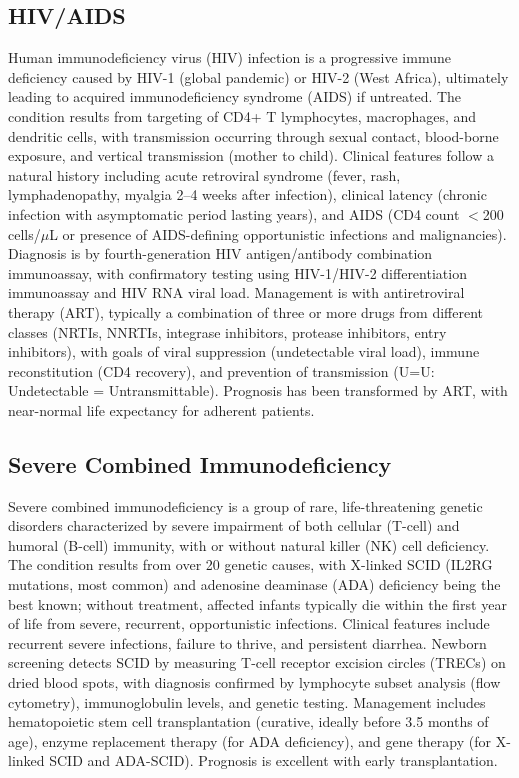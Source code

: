 \subsection{HIV/AIDS}
\label{sec:HIV/AIDS}
Human immunodeficiency virus (HIV) infection is a progressive immune deficiency caused by HIV-1 (global pandemic) or HIV-2 (West Africa), ultimately leading to acquired immunodeficiency syndrome (AIDS) if untreated. The condition results from targeting of CD4+ T lymphocytes, macrophages, and dendritic cells, with transmission occurring through sexual contact, blood-borne exposure, and vertical transmission (mother to child). Clinical features follow a natural history including acute retroviral syndrome (fever, rash, lymphadenopathy, myalgia 2--4 weeks after infection), clinical latency (chronic infection with asymptomatic period lasting years), and AIDS (CD4 count $<$200 cells/$\mu$L or presence of AIDS-defining opportunistic infections and malignancies). Diagnosis is by fourth-generation HIV antigen/antibody combination immunoassay, with confirmatory testing using HIV-1/HIV-2 differentiation immunoassay and HIV RNA viral load. Management is with antiretroviral therapy (ART), typically a combination of three or more drugs from different classes (NRTIs, NNRTIs, integrase inhibitors, protease inhibitors, entry inhibitors), with goals of viral suppression (undetectable viral load), immune reconstitution (CD4 recovery), and prevention of transmission (U=U: Undetectable = Untransmittable). Prognosis has been transformed by ART, with near-normal life expectancy for adherent patients.

\subsection{Severe Combined Immunodeficiency}
\label{sec:Severe Combined Immunodeficiency}
Severe combined immunodeficiency is a group of rare, life-threatening genetic disorders characterized by severe impairment of both cellular (T-cell) and humoral (B-cell) immunity, with or without natural killer (NK) cell deficiency. The condition results from over 20 genetic causes, with X-linked SCID (IL2RG mutations, most common) and adenosine deaminase (ADA) deficiency being the best known; without treatment, affected infants typically die within the first year of life from severe, recurrent, opportunistic infections. Clinical features include recurrent severe infections, failure to thrive, and persistent diarrhea. Newborn screening detects SCID by measuring T-cell receptor excision circles (TRECs) on dried blood spots, with diagnosis confirmed by lymphocyte subset analysis (flow cytometry), immunoglobulin levels, and genetic testing. Management includes hematopoietic stem cell transplantation (curative, ideally before 3.5 months of age), enzyme replacement therapy (for ADA deficiency), and gene therapy (for X-linked SCID and ADA-SCID). Prognosis is excellent with early transplantation.


